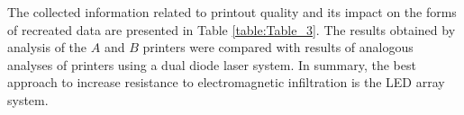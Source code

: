 \documentclass[letterpaper,journal]{ieeetran}
\begin{document}
The collected information related to printout quality and its impact on the
forms of recreated data are presented in Table \ref{table:Table_3}. The
results obtained by analysis of the $A$ and $B$ printers were compared with
results of analogous analyses of printers using a dual diode laser system. In
summary, the best approach to increase resistance to electromagnetic
infiltration is the LED array system.

\singlespacing



\end{document}
